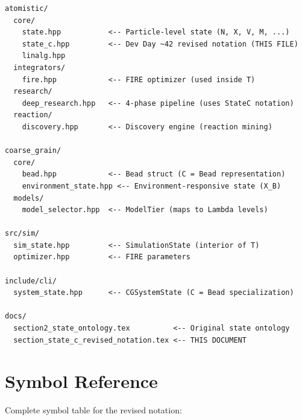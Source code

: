\documentclass[11pt]{article}
\begin{document}
\begin{lstlisting}[basicstyle=\ttfamily\scriptsize]
atomistic/
  core/
    state.hpp           <-- Particle-level state (N, X, V, M, ...)
    state_c.hpp         <-- Dev Day ~42 revised notation (THIS FILE)
    linalg.hpp
  integrators/
    fire.hpp            <-- FIRE optimizer (used inside T)
  research/
    deep_research.hpp   <-- 4-phase pipeline (uses StateC notation)
  reaction/
    discovery.hpp       <-- Discovery engine (reaction mining)

coarse_grain/
  core/
    bead.hpp            <-- Bead struct (C = Bead representation)
    environment_state.hpp <-- Environment-responsive state (X_B)
  models/
    model_selector.hpp  <-- ModelTier (maps to Lambda levels)

src/sim/
  sim_state.hpp         <-- SimulationState (interior of T)
  optimizer.hpp         <-- FIRE parameters

include/cli/
  system_state.hpp      <-- CGSystemState (C = Bead specialization)

docs/
  section2_state_ontology.tex          <-- Original state ontology
  section_state_c_revised_notation.tex <-- THIS DOCUMENT
\end{lstlisting}

\section{Symbol Reference}

Complete symbol table for the revised notation:
\end{document}
